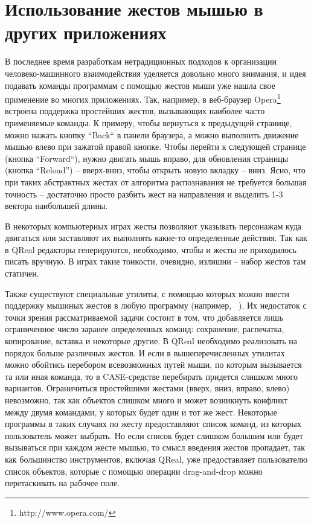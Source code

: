 \documentclass[a5paper]{article}
\begin{document}
\section{Использование жестов мышью в других приложениях}

В последнее время разработкам нетрадиционных подходов к организации человеко-машинного взаимодействия уделяется довольно много 
внимания, и идея подавать команды программам с помощью жестов мыши уже нашла свое применение во многих приложениях. Так, например, 
в веб-браузер Opera\footnote{http://www.opera.com/} встроена поддержка простейших жестов, вызывающих наиболее часто применяемые команды. К примеру, чтобы вернуться 
к предыдущей странице, можно нажать кнопку ``Back`` в панели браузера, а можно выполнить движение мышью влево при зажатой правой кнопке. 
Чтобы перейти к следующей странице (кнопка ``Forward``), нужно двигать мышь вправо, для обновления страницы (кнопка ``Reload'') -- вверх-вниз,
чтобы открыть новую вкладку -- вниз. Ясно, что при таких абстрактных жестах от алгоритма распознавания не требуется
большая точность -- достаточно просто разбить жест на направления и выделить 1-3 вектора наибольшей длины.

В некоторых компьютерных играх жесты позволяют указывать персонажам куда двигаться или заставляют их выполнять какие-то определенные
действия. Так как в QReal редакторы генерируются, необходимо, чтобы и жесты не приходилось писать вручную. В играх такие тонкости, очевидно,
излишни -- набор жестов там статичен.

Также существуют специальные утилиты, с помощью которых можно ввести поддержку мышиных жестов в любую программу 
(например, ~\cite{strokeIt, gMote, xstroke, flyGesture}).
Их недостаток с точки зрения рассматриваемой задачи состоит в том, что добавляется лишь ограниченное число заранее определенных команд: 
сохранение, распечатка, копирование, вставка и некоторые другие. В QReal необходимо реализовать на порядок больше различных жестов. И если в
вышеперечисленных утилитах можно обойтись перебором всевозможных путей мыши, по которым вызывается та или иная команда, то в CASE-средстве 
перебирать придется слишком много вариантов. Ограничиться простейшими жестами (вверх, вниз, вправо, влево) невозможно, так как 
объектов слишком много и может возникнуть конфликт между двумя командами, у которых будет один и тот же жест. Некоторые программы 
в таких случаях по жесту предоставляют список команд, из которых пользователь может выбрать. Но если список будет слишком большим или 
будет вызываться при каждом жесте мышью, то смысл введения жестов пропадает, так как большинство инструментов, включая QReal, уже 
предоставляет пользователю список объектов, которые с помощью операции drag-and-drop можно перетаскивать на рабочее поле.
\end{document}
